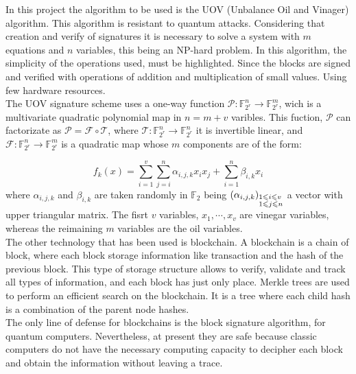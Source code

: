 In this project the algorithm to be used is the UOV (Unbalance Oil and Vinager) algorithm. This algorithm is resistant to quantum attacks. Considering that creation and verify of signatures it is necessary to solve a system with $m$ equations and $n$ variables, this being an NP-hard problem. In this algorithm, the simplicity of the operations used, must be highlighted. Since the blocks are signed and verified with operations of addition and multiplication of small values. Using few hardware resources.\\

The UOV signature scheme uses a one-way function $\mathcal{P}: \mathds{F}_{2^r}^n \rightarrow \mathds{F}_{2^r}^m$, wich is a multivariate quadratic polynomial map in $n = m + v$ varibles. This fuction, $\mathcal{P}$ can factorizate as $\mathcal{P} = \mathcal{F} \circ \mathcal{T}$, where $\mathcal{T}: \mathds{F}_{2^r}^n \rightarrow \mathds{F}_{2^r}^n$ it is invertible linear, and $\mathcal{F}: \mathds{F}_{2^r}^n \rightarrow \mathds{F}_{2^r}^m$ is a quadratic map whose $m$ components are of the form:

\begin{equation}\label{eq:fun}
f_k(x) = \sum_{i=1}^v \sum_{j=i}^n \alpha_{i,j,k} x_i x_j + \sum_{i=1}^n \beta_{i,k} x_i
\end{equation}
where $\alpha_{i,j,k}$ and $\beta_{i,k}$ are taken randomly in $\mathds{F}_2$ being $\left(\alpha_{i,j,k}\right)_{\begin{subarray}{l}{1\leqslant i \leqslant v }\\ {1 \leqslant j \leqslant n}\end{subarray}}$ a vector with upper triangular matrix. The fisrt $v$ variables, $x_1, \cdots, x_v$ are vinegar variables, whereas the reimaining $m$ variables are the oil variables.\\

The other technology that has been used is blockchain. A blockchain is a chain of block, where each block storage information like transaction and the hash of the previous block. This type of storage structure allows to verify, validate and track all types of information, and each block has just only place. Merkle trees are used to perform an efficient search on the blockchain. It is a tree where each child hash is a combination of the parent node hashes.\\

The only line of defense for blockchains is the block signature algorithm, for quantum computers. Nevertheless, at present they are safe because classic computers do not have the necessary computing capacity to decipher each block and obtain the information without leaving a trace.\\

